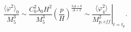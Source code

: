 \begin{equation}
\frac{ \langle   \varphi^2 \rangle_0}{M_5^3} \sim 
\frac{C_0^2 \lambda_0 H^2}{M_5^3}\left( \frac{p}{H} \right)^{\frac{3 \Delta+8}{\Delta+2}}
\sim \left. \frac{\langle \varphi_4^2  \rangle}{M_{p,eff}^2} 
\right \vert_{t=t_p} .
\end{equation}

